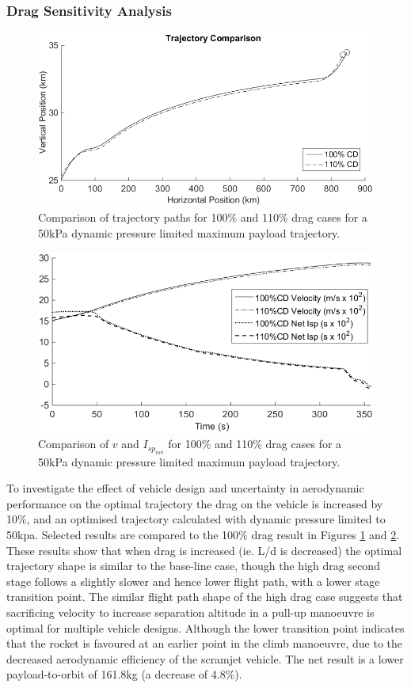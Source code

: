\documentclass[journal]{new-aiaa}
\newcommand{\PayloadToOrbitHighDrag}{161.8}
\begin{document}
\subsubsection{Drag Sensitivity Analysis}\label{subsection:dragvariation}
\begin{figure}[ht]
	\centering
	\includegraphics[width=.7\linewidth]{DragComparisonTraj}
	\caption{Comparison of trajectory paths for 100\% and 110\% drag cases for a 50kPa dynamic pressure limited maximum payload trajectory.}
	\label{fig:DragCompTraj}
\end{figure}

\begin{figure}[ht]
	\centering
	\includegraphics[width=.6\linewidth]{DragComparisonOther}
	\caption{Comparison of $v$ and $I_{sp_{net}}$ for 100\% and 110\% drag cases for a 50kPa dynamic pressure limited maximum payload trajectory.}
	\label{fig:DragCompOther}
\end{figure}

To investigate the effect of vehicle design and uncertainty in aerodynamic performance on the optimal trajectory the drag on the vehicle is increased by 10\%, and an optimised trajectory calculated with dynamic pressure limited to 50kpa. Selected results are compared to the 100\% drag result in Figures \ref{fig:DragCompTraj} and \ref{fig:DragCompOther}. 
These results show that when drag is increased (ie. L/d is decreased) the optimal trajectory shape is similar to the base-line case, though the high drag second stage follows a slightly slower and hence lower flight path, with a lower stage transition point. The similar flight path shape of the high drag case suggests that sacrificing velocity to increase separation altitude in a pull-up manoeuvre is optimal for multiple vehicle designs. Although the lower transition point indicates that the rocket is favoured at an earlier point in the climb manoeuvre, due to the decreased aerodynamic efficiency of the scramjet vehicle. 
The net result is  a lower payload-to-orbit of \PayloadToOrbitHighDrag kg (a decrease of 4.8\%). 
\end{document}
